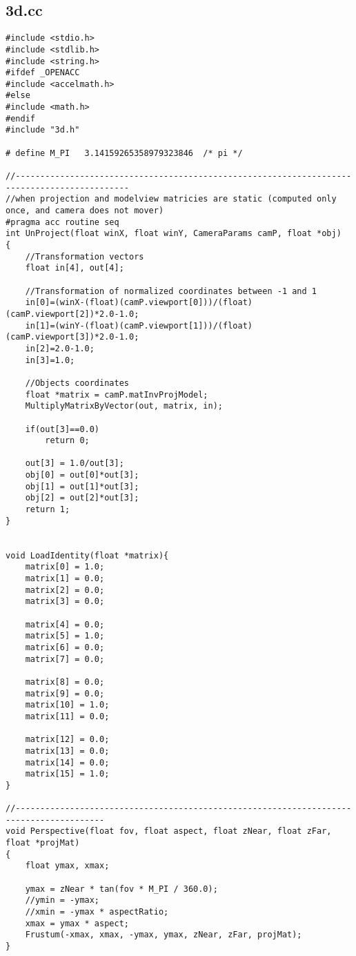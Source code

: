 \documentclass[]{article}
\begin{document}
\subsection{3d.cc}
\begin{Verbatim}[fontsize= \footnotesize, tabsize=4]
#include <stdio.h>
#include <stdlib.h>
#include <string.h>
#ifdef _OPENACC
#include <accelmath.h>
#else
#include <math.h>
#endif
#include "3d.h"

# define M_PI   3.14159265358979323846  /* pi */

//---------------------------------------------------------------------------------------------
//when projection and modelview matricies are static (computed only once, and camera does not mover)
#pragma acc routine seq
int UnProject(float winX, float winY, CameraParams camP, float *obj)
{
	//Transformation vectors
	float in[4], out[4];
	
	//Transformation of normalized coordinates between -1 and 1
	in[0]=(winX-(float)(camP.viewport[0]))/(float)(camP.viewport[2])*2.0-1.0;
	in[1]=(winY-(float)(camP.viewport[1]))/(float)(camP.viewport[3])*2.0-1.0;
	in[2]=2.0-1.0;
	in[3]=1.0;
	
	//Objects coordinates
	float *matrix = camP.matInvProjModel;
	MultiplyMatrixByVector(out, matrix, in);
	
	if(out[3]==0.0)
		return 0;

	out[3] = 1.0/out[3];
	obj[0] = out[0]*out[3];
	obj[1] = out[1]*out[3];
	obj[2] = out[2]*out[3];
	return 1;
}


void LoadIdentity(float *matrix){
	matrix[0] = 1.0;
	matrix[1] = 0.0;
	matrix[2] = 0.0;
	matrix[3] = 0.0;
	
	matrix[4] = 0.0;
	matrix[5] = 1.0;
	matrix[6] = 0.0;
	matrix[7] = 0.0;

	matrix[8] = 0.0;
	matrix[9] = 0.0;
	matrix[10] = 1.0;
	matrix[11] = 0.0;
	
	matrix[12] = 0.0;
	matrix[13] = 0.0;
	matrix[14] = 0.0;
	matrix[15] = 1.0;
}

//----------------------------------------------------------------------------------------
void Perspective(float fov, float aspect, float zNear, float zFar, float *projMat)
{
	float ymax, xmax;
	
	ymax = zNear * tan(fov * M_PI / 360.0);
	//ymin = -ymax;
	//xmin = -ymax * aspectRatio;
	xmax = ymax * aspect;
	Frustum(-xmax, xmax, -ymax, ymax, zNear, zFar, projMat);
}


\end{Verbatim}
\end{document}
